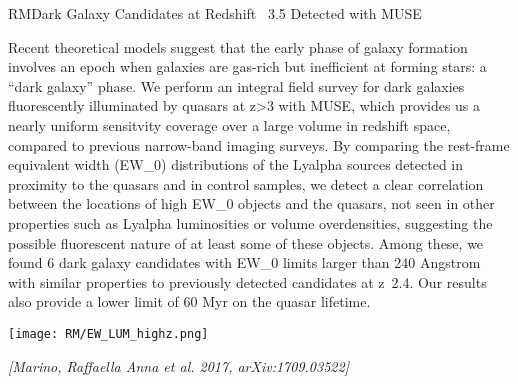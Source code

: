 \begin{section}{RM}{Dark Galaxy Candidates at Redshift ~3.5 Detected with MUSE}
  \begin{minipage}[l]{\textwidth}

    {\small Recent theoretical models suggest that the early phase of galaxy
      formation involves an epoch when galaxies are gas-rich but inefficient
      at forming stars: a ``dark galaxy'' phase. We perform an integral field
      survey for dark galaxies fluorescently illuminated by quasars at z>3
      with MUSE, which provides us a nearly uniform sensitvity coverage over a
      large volume in redshift space, compared to previous narrow-band imaging
      surveys. By comparing the rest-frame equivalent width (EW\_0)
      distributions of the Lyalpha sources detected in proximity to the
      quasars and in control samples, we detect a clear correlation between
      the locations of high EW\_0 objects and the quasars, not seen in other
      properties such as Lyalpha luminosities or volume overdensities,
      suggesting the possible fluorescent nature of at least some of these
      objects. Among these, we found 6 dark galaxy candidates with EW\_0 limits
      larger than 240 Angstrom with similar properties to previously detected
      candidates at z~2.4. Our results also provide a lower limit of 60 Myr on
      the quasar lifetime.}
  \end{minipage}

  \vspace{0.5cm}

  \begin{minipage}{\linewidth}
    \begin{center}
      \texttt{[image: RM/EW\_LUM\_highz.png]}
    \end{center}
  \end{minipage}

  \vspace{0.5cm}

  {\footnotesize \textit{[Marino, Raffaella Anna et al. 2017, arXiv:1709.03522]}}
\end{section}